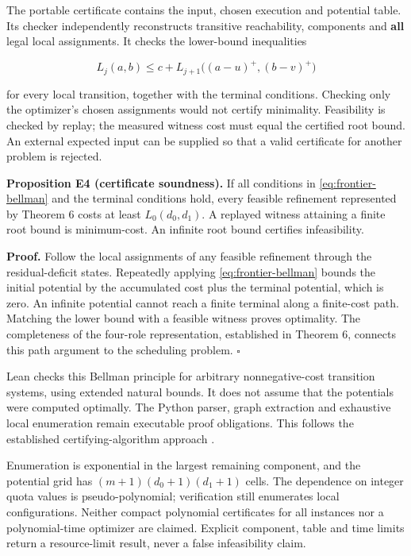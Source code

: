 The portable certificate contains the input, chosen execution and
potential table. Its checker independently reconstructs transitive
reachability, components and \textbf{all} legal local assignments. It
checks the lower-bound inequalities

\[
L_j(a,b)\le c+L_{j+1}\bigl((a-u)^+,(b-v)^+\bigr) \tag{E7}\label{eq:frontier-bellman}
\]

for every local transition, together with the terminal conditions.
Checking only the optimizer's chosen assignments would not certify
minimality. Feasibility is checked by replay; the measured witness cost
must equal the certified root bound. An external expected input can be
supplied so that a valid certificate for another problem is rejected.

\textbf{Proposition E4 (certificate soundness).} If all conditions in
\eqref{eq:frontier-bellman} and the terminal conditions hold, every
feasible refinement represented by Theorem 6 costs at least
\(L_0(d_0,d_1)\). A replayed witness attaining a finite root bound is
minimum-cost. An infinite root bound certifies infeasibility.

\textbf{Proof.} Follow the local assignments of any feasible refinement
through the residual-deficit states. Repeatedly applying
\eqref{eq:frontier-bellman} bounds the initial potential by the
accumulated cost plus the terminal potential, which is zero. An infinite
potential cannot reach a finite terminal along a finite-cost path.
Matching the lower bound with a feasible witness proves optimality. The
completeness of the four-role representation, established in Theorem 6,
connects this path argument to the scheduling problem. \(\square\)

Lean checks this Bellman principle for arbitrary nonnegative-cost
transition systems, using extended natural bounds. It does not assume
that the potentials were computed optimally. The Python parser, graph
extraction and exhaustive local enumeration remain executable proof
obligations. This follows the established certifying-algorithm approach
\cite{mcconnell2011certifying}.

Enumeration is exponential in the largest remaining component, and the
potential grid has \((m+1)(d_0+1)(d_1+1)\) cells. The dependence on
integer quota values is pseudo-polynomial; verification still enumerates
local configurations. Neither compact polynomial certificates for all
instances nor a polynomial-time optimizer are claimed. Explicit
component, table and time limits return a resource-limit result, never a
false infeasibility claim.

